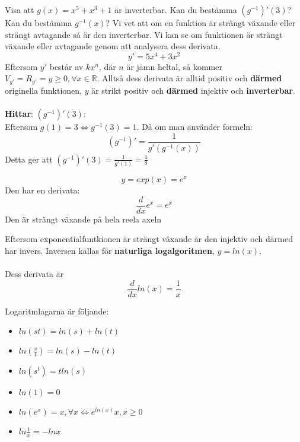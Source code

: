 \documentclass{report}
\begin{document}
\vspace{20pt}
\qs{}
{
	Visa att $ g(x) = x^5+x^3+1 $ är inverterbar. Kan du bestämma $ (g^{-1})'(3) $? Kan du bestämma $ g^{-1}(x) $?
}
\sol Vi vet att om en funktion är strängt växande eller strängt avtagande så är den inverterbar. Vi kan se om funktionen är strängt växande eller avtagande genom att analysera dess derivata.
\begin{equation*}
y' = 5x^4+3x^2
\end{equation*}
Eftersom $ y' $ består av $ kx^n$, där $ n $ är jämn heltal, så kommer $ V_{y'} = R_{y'} = y \ge 0, \forall x \in \mathbb{R}$. Alltså dess derivata är alltid positiv och \textbf{därmed} originella funktionen, $ y $ är strikt positiv och \textbf{därmed} injektiv och \textbf{inverterbar}.\\\\

\noindent
\textbf{Hittar}: $ (g^{-1})'(3) $:\\
Eftersom $ g(1) = 3 \iff g^{-1}(3) = 1 $. Då om man använder formeln:
\begin{equation*}
	(g^{-1})' = \frac{1}{g'(g^{-1}(x))} 
\end{equation*}
Detta ger att $ (g^{-1})'(3) = \frac{1}{g'(1)} = \frac{1}{8}  $ 

\pagebreak
{}
{
\begin{equation*}
y = exp(x) = e^x
\end{equation*}
Den har en derivata:
\begin{equation*}
\frac{d}{dx}e^x = e^x
\end{equation*}
Den är strängt växande på hela reela axeln
}

{
Eftersom exponentialfuntkionen är strängt växande är den injektiv och därmed har invers. Inversen kallas för \textbf{naturliga logalgoritmen}, $ y=ln(x) $.\\\\

Dess derivata är
\begin{equation*}
\frac{d}{dx}ln(x) = \frac{1}{x} 
\end{equation*}

Logaritmlagarna är följande:
\begin{itemize}
	\item $ ln(st) = ln(s) + ln(t) $
	\item $ ln( \frac{s}{t} ) = ln(s) - ln(t) $
	\item $ ln(s^t) = t ln(s) $
	\item $ ln(1) = 0 $
	\item $ ln(e^x) = x, \forall x \iff e^{ln(x)} x, x \ge 0$
	\item $ ln \frac{1}{x} = - lnx $ 
\end{itemize}
}
\end{document}

